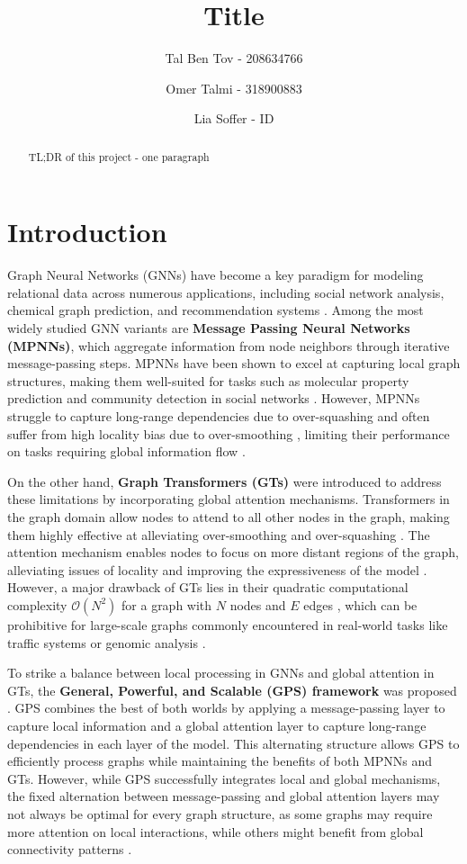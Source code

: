 \documentclass{acmart}
\title{Title}
\author{Tal Ben Tov - 208634766}
\author{Omer Talmi - 318900883}
\author{Lia Soffer - ID}
\date{}
\begin{document}
\begin{abstract}
TL;DR of this project - one paragraph
\end{abstract}
\maketitle

\section{Introduction}

Graph Neural Networks (GNNs) have become a key paradigm for modeling relational data across numerous applications, including social network analysis, chemical graph prediction, and recommendation systems \cite{gilmer2017neural}. Among the most widely studied GNN variants are \textbf{Message Passing Neural Networks (MPNNs)}, which aggregate information from node neighbors through iterative message-passing steps. MPNNs have been shown to excel at capturing local graph structures, making them well-suited for tasks such as molecular property prediction and community detection in social networks \cite{gilmer2017neural}. However, MPNNs struggle to capture long-range dependencies due to over-squashing \cite{alon2021bottleneck} and often suffer from high locality bias due to over-smoothing \cite{oono2020expressive}, limiting their performance on tasks requiring global information flow \cite{dwivedi2020benchmarking}.


On the other hand, \textbf{Graph Transformers (GTs)} were introduced to address these limitations by incorporating global attention mechanisms. Transformers in the graph domain allow nodes to attend to all other nodes in the graph, making them highly effective at alleviating over-smoothing and over-squashing \cite{alon2021bottleneck, topping2021curvature}. The attention mechanism enables nodes to focus on more distant regions of the graph, alleviating issues of locality and improving the expressiveness of the model \cite{xu2019powerful, morris2019weisfeiler}. However, a major drawback of GTs lies in their quadratic computational complexity $\mathcal{O}(N^2)$ for a graph with $N$ nodes and $E$ edges \cite{vaswani2017attention}, which can be prohibitive for large-scale graphs commonly encountered in real-world tasks like traffic systems or genomic analysis \cite{dwivedi2020benchmarking}.

To strike a balance between local processing in GNNs and global attention in GTs, the \textbf{General, Powerful, and Scalable (GPS) framework} was proposed \cite{rampasek2022gps}. GPS combines the best of both worlds by applying a message-passing layer to capture local information and a global attention layer to capture long-range dependencies in each layer of the model. This alternating structure allows GPS to efficiently process graphs while maintaining the benefits of both MPNNs and GTs. However, while GPS successfully integrates local and global mechanisms, the fixed alternation between message-passing and global attention layers may not always be optimal for every graph structure, as some graphs may require more attention on local interactions, while others might benefit from global connectivity patterns \cite{bronstein2021geometric}.
\end{document}
